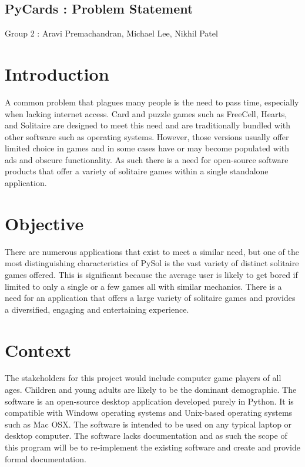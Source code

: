 \documentclass{article}
\begin{document}
	\begin{center}
		\section*{PyCards : Problem Statement}
		Group 2 : Aravi Premachandran, Michael Lee, Nikhil Patel
	\end{center}
	
	\section{Introduction}
	A common problem that plagues many people is the need to pass time, 
	especially when lacking internet access. Card and puzzle games such as 
	FreeCell, Hearts, and Solitaire are designed to meet this need and are 
	traditionally bundled with other software such as operating systems. 
	However, those versions usually offer limited choice in games and in some 
	cases have or may become populated with ads and obscure functionality. As 
	such there is a need for open-source software products that offer a variety 
	of solitaire games within a single standalone application.
	
	\section{Objective}
	There are numerous applications that exist to meet a similar need, but one 
	of the most distinguishing characteristics of PySol is the vast variety of 
	distinct solitaire games offered. This is significant because the average 
	user is likely to get bored if limited to only a single or a few games all 
	with similar mechanics. There is a need for an application that offers a 
	large variety of solitaire games and provides a diversified, engaging and 
	entertaining experience.
	
	\section{Context}
	The stakeholders for this project would include computer game players of 
	all ages. Children and young adults are likely to be the dominant 
	demographic.
	\newline
	\newline
	The software is an open-source desktop application developed purely in 
	Python. It is compatible with Windows operating systems and Unix-based 
	operating systems such as Mac OSX. The software is intended to be used on 
	any typical laptop or desktop computer. The software lacks documentation 
	and as such the scope of this program will be to re-implement the existing 
	software and create and provide formal documentation.
	
\end{document}
